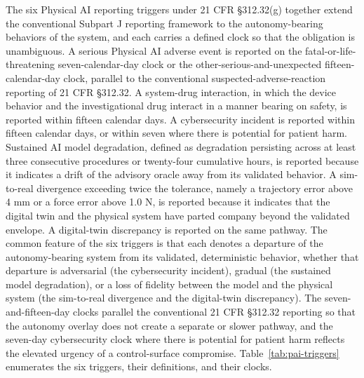 The six Physical AI reporting triggers under 21 CFR \S 312.32(g) together extend the
conventional Subpart J reporting framework to the autonomy-bearing behaviors of the
system, and each carries a defined clock so that the obligation is unambiguous. A
serious Physical AI adverse event is reported on the fatal-or-life-threatening
seven-calendar-day clock or the other-serious-and-unexpected fifteen-calendar-day
clock, parallel to the conventional suspected-adverse-reaction reporting of 21 CFR
\S 312.32. A system-drug interaction, in which the device behavior and the
investigational drug interact in a manner bearing on safety, is reported within
fifteen calendar days. A cybersecurity incident is reported within fifteen calendar
days, or within seven where there is potential for patient harm. Sustained AI model
degradation, defined as degradation persisting across at least three consecutive
procedures or twenty-four cumulative hours, is reported because it indicates a drift
of the advisory oracle away from its validated behavior. A sim-to-real divergence
exceeding twice the tolerance, namely a trajectory error above 4 mm or a force error
above 1.0 N, is reported because it indicates that the digital twin and the physical
system have parted company beyond the validated envelope. A digital-twin discrepancy
is reported on the same pathway. The common feature of the six triggers is that each
denotes a departure of the autonomy-bearing system from its validated, deterministic
behavior, whether that departure is adversarial (the cybersecurity incident), gradual
(the sustained model degradation), or a loss of fidelity between the model and the
physical system (the sim-to-real divergence and the digital-twin discrepancy). The
seven-and-fifteen-day clocks parallel the conventional 21 CFR \S 312.32 reporting so
that the autonomy overlay does not create a separate or slower pathway, and the
seven-day cybersecurity clock where there is potential for patient harm reflects the
elevated urgency of a control-surface compromise. Table~\ref{tab:pai-triggers}
enumerates the six triggers, their definitions, and their clocks.


